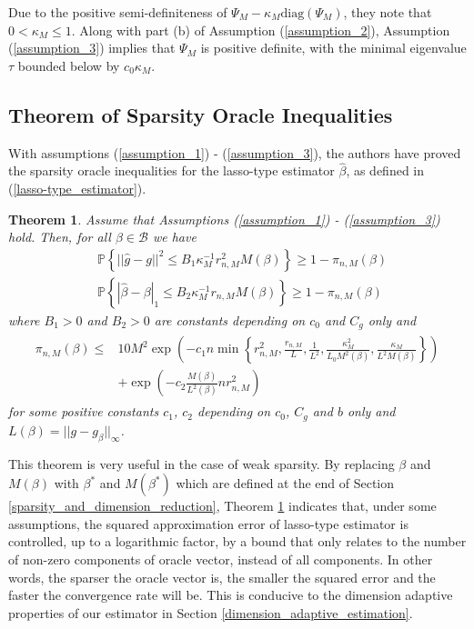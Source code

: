 \documentclass[12pt, a4paper]{article}
\theoremstyle{MAstyle} \newtheorem{assumption}{Assumption}[section]
\theoremstyle{MAstyle} \newtheorem{definition}{Definition}[section]
\theoremstyle{MAstyle} \newtheorem{theorem}{Theorem}[section]
\theoremstyle{MAstyle} \newtheorem{corollary}{Corollary}[section]
\begin{document}
            Due to the positive semi-definiteness of $\Psi_M-\kappa_M\mathrm{diag}(\Psi_M)$, they note that $0< \kappa_M \le 1$. Along with part (b) of Assumption (\ref{assumption_2}), Assumption (\ref{assumption_3}) implies that $\Psi_M$ is positive definite, with the minimal eigenvalue $\tau$ bounded below by $c_0\kappa_M$. 
            
            \subsection{Theorem of Sparsity Oracle Inequalities}\label{sparsity_oracle_inequalities}

            With assumptions (\ref{assumption_1}) - (\ref{assumption_3}), the authors have proved the sparsity oracle inequalities for the lasso-type estimator $\widehat{\beta}$, as defined in (\ref{lasso-type_estimator}).

            \begin{theorem}\label{oracle_inequalities_theorem}
                Assume that Assumptions (\ref{assumption_1}) - (\ref{assumption_3}) hold. Then, for all $\beta \in \mathcal{B}$ we have
                \begin{align}
                    &\mathbb{P}\left\{ ||\widehat{g}-g||^2 \le B_1 \kappa_M^{-1} r_{n,M}^2 M(\beta) \right\} \ge  1-\pi_{n,M}(\beta)\\
                    &\mathbb{P}\left\{ |\widehat{\beta}-\beta|_1 \le B_2 \kappa_M^{-1} r_{n,M} M(\beta) \right\} \ge 1-\pi_{n,M}(\beta)
                \end{align}
                where $B_1>0$ and $B_2>0$ are constants depending on $c_0$ and $C_g$ only and
                \begin{align}\label{pi_n_M}
                \begin{split}
                    \pi_{n,M}(\beta) \le & 10M^2 \exp\left( -c_1n \min \left\{ r_{n,M}^2, \frac{r_{n,M}}{L}, \frac{1}{L^2}, \frac{\kappa_M^2}{L_0 M^2(\beta)}, \frac{\kappa_M}{L^2M(\beta)} \right\} \right)\\
                    & +\exp\left( -c_2 \frac{M(\beta)}{L^2(\beta)}nr_{n,M}^2 \right)
                \end{split}
                \end{align}
                for some positive constants $c_1$, $c_2$ depending on $c_0$, $C_g$ and $b$ only and $L(\beta)=||g-g_{\beta}||_{\infty}$.
            \end{theorem}

            This theorem is very useful in the case of weak sparsity. By replacing $\beta$ and $M(\beta)$ with $\beta^*$ and $M(\beta^*)$ which are defined at the end of Section \ref{sparsity_and_dimension_reduction}, Theorem \ref{oracle_inequalities_theorem} indicates that, under some assumptions, the squared approximation error of lasso-type estimator is controlled, up to a logarithmic factor, by a bound that only relates to the number of non-zero components of oracle vector, instead of all components. In other words, the sparser the oracle vector is, the smaller the squared error and the faster the convergence rate will be. This is conducive to the dimension adaptive properties of our estimator in Section \ref{dimension_adaptive_estimation}.
\end{document}
